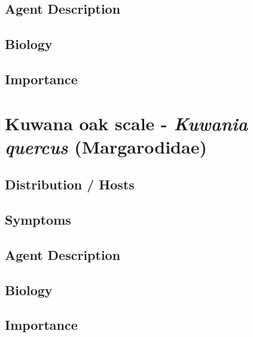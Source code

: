 \documentclass[
]{book}
\begin{document}
\subsection*{Agent Description}\label{agent-description-11}

\subsection*{Biology}\label{biology-11}

\subsection*{Importance}\label{importance-11}

\section*{\texorpdfstring{Kuwana oak scale - \emph{Kuwania quercus} (Margarodidae)}{Kuwana oak scale - Kuwania quercus (Margarodidae)}}\label{kuwana-oak-scale---kuwania-quercus-margarodidae}

\subsection*{Distribution / Hosts}\label{distribution-hosts-12}

\subsection*{Symptoms}\label{symptoms-12}

\subsection*{Agent Description}\label{agent-description-12}

\subsection*{Biology}\label{biology-12}

\subsection*{Importance}\label{importance-12}
\end{document}
